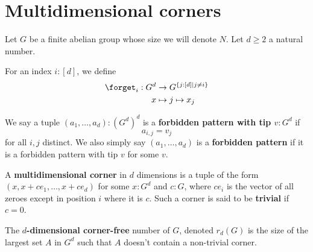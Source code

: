 
\chapter{Multidimensional corners}

Let $G$ be a finite abelian group whose size we will denote $N$. Let $d \ge 2$ a natural number.

\begin{definition}
  \label{def:forget}
  \uses{}
  \leanok

  For an index $i : [d]$, we define
  \begin{align}
    \forget_i : G^d & \to G^{\{j : [d] \mid j \ne i\}} \\
    x & \mapsto j \mapsto x_j
  \end{align}
\end{definition}

\begin{definition}
  \label{def:forbidden-pattern}
  \uses{}
  \leanok

  We say a tuple $(a_1, \dots, a_d) : (G^d)^d$ is a {\bf forbidden pattern with tip $v : G^d$} if
  $$a_{i, j} = v_j$$
  for all $i, j$ distinct. We also simply say $(a_1, \dots, a_d)$ is a {\bf forbidden pattern} if it is a forbidden pattern with tip $v$ for some $v$.
\end{definition}

\begin{definition}
  \label{def:multicorner}
  \leanok

  A {\bf multidimensional corner} in $d$ dimensions is a tuple of the form $(x, x + ce_1, \dots, x + ce_d)$ for some $x : G^d$ and $c : G$, where $ce_i$ is the vector of all zeroes except in position $i$ where it is $c$. Such a corner is said to be {\bf trivial} if $c = 0$.
\end{definition}

\begin{definition}
  \label{def:corner-free-num}

  The {\bf $d$-dimensional corner-free} number of $G$, denoted $r_d(G)$ is the size of the largest set $A$ in $G^d$ such that $A$ doesn't contain a non-trivial corner.
\end{definition}

